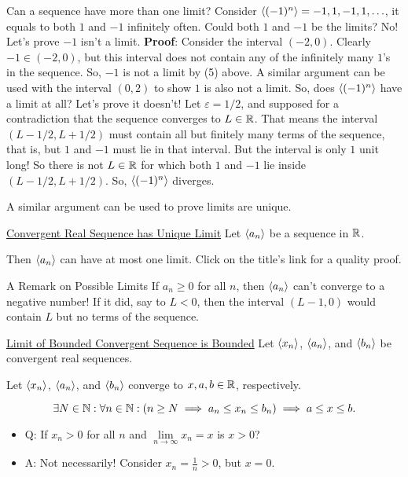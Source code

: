 \begin{Example}{}{}
    Can a sequence have more than one limit?
    Consider $ \langle(-1)^n\rangle=-1,1,-1,1,\ldots $, it equals to both $ 1 $ and $ -1 $ infinitely often. Could both $ 1 $ and $ -1 $
    be the limits? No! Let's prove $ -1 $ isn't a limit.
    \tcblower{}
    \textbf{Proof}: Consider the interval $ (-2,0) $. Clearly $ -1\in(-2,0) $, but
    this interval does not contain any of the infinitely many $ 1 $'s in the sequence. So, $ -1 $
    is not a limit by (5) above. A similar argument can be used with the interval $ (0,2) $ to show
    $ 1 $ is also not a limit. So, does $ \langle(-1)^n\rangle $ have a limit at all? Let's prove it doesn't!
    Let $ \varepsilon=1/2 $, and supposed for a contradiction that the sequence converges to $ L\in\mathbb{R} $. That means
    the interval $ (L-1/2,L+1/2) $ must contain all but finitely many terms of the sequence, that is, but $ 1 $ and $ -1 $
    must lie in that interval. But the interval is only $ 1 $ unit long! So there is not $ L\in\mathbb{R} $ for which both $ 1 $ and $ -1 $
    lie inside $ (L-1/2,L+1/2) $. So, $ \langle(-1)^n\rangle $ diverges.
\end{Example}
A similar argument can be used to prove limits are unique.
\begin{Theorem}{\href{https://proofwiki.org/wiki/Convergent_Real_Sequence_has_Unique_Limit}{Convergent Real Sequence has Unique Limit}}{}
    Let $ \langle a_n\rangle $ be a sequence in $ \mathbb{R} $.\bigskip

    Then $ \langle a_n\rangle $ can have at most one limit.
    \tcblower{}
    Click on the title's link for a quality proof.
\end{Theorem}
\begin{Remark}{A Remark on Possible Limits}{}
    If $ a_n\ge 0 $ for all $ n $, then $ \langle a_n\rangle $ can't converge to a negative number! If it did, say to $ L<0 $,
    then the interval $ (L-1,0) $ would contain $ L $ but no terms of the sequence.
\end{Remark}
\begin{Theorem}{\href{https://proofwiki.org/wiki/Limit_of_Bounded_Convergent_Sequence_is_Bounded}{Limit of Bounded Convergent Sequence is Bounded}}{}
    Let $ \langle x_n\rangle $, $ \langle a_n\rangle $, and $ \langle b_n\rangle $ be convergent real sequences.\smallskip

    Let $ \langle x_n\rangle $, $ \langle a_n\rangle $, and $ \langle b_n\rangle $ converge to $ x,a,b\in\mathbb{R} $, respectively.\bigskip

    \[ \exists N\in\mathbb{N}:\forall n\in\mathbb{N}:(n\ge N\implies a_n\le x_n\le b_n)
        \implies a\le x\le b. \]
\end{Theorem}
\begin{itemize}
    \item Q\@: If $ x_n>0 $ for all $ n $ and $ \lim\limits_{{n} \to {\infty}}x_n=x $ is $ x>0 $?
    \item A\@: Not necessarily! Consider $ x_n=\frac{1}{n}>0 $, but $ x=0 $.
\end{itemize}
